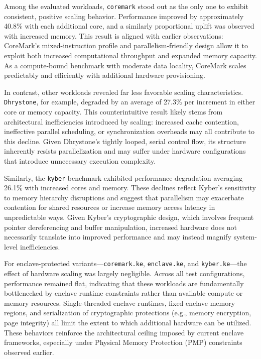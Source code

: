 Among the evaluated workloads, \texttt{coremark} stood out as the only one to exhibit consistent, positive scaling behavior. Performance improved by approximately 40.8\% with each additional core, and a similarly proportional uplift was observed with increased memory. This result is aligned with earlier observations: CoreMark’s mixed-instruction profile and parallelism-friendly design allow it to exploit both increased computational throughput and expanded memory capacity. As a compute-bound benchmark with moderate data locality, CoreMark scales predictably and efficiently with additional hardware provisioning.

In contrast, other workloads revealed far less favorable scaling characteristics. \texttt{Dhrystone}, for example, degraded by an average of 27.3\% per increment in either core or memory capacity. This counterintuitive result likely stems from architectural inefficiencies introduced by scaling: increased cache contention, ineffective parallel scheduling, or synchronization overheads may all contribute to this decline. Given Dhrystone’s tightly looped, serial control flow, its structure inherently resists parallelization and may suffer under hardware configurations that introduce unnecessary execution complexity.

Similarly, the \texttt{kyber} benchmark exhibited performance degradation averaging 26.1\% with increased cores and memory. These declines reflect Kyber’s sensitivity to memory hierarchy disruptions and suggest that parallelism may exacerbate contention for shared resources or increase memory access latency in unpredictable ways. Given Kyber’s cryptographic design, which involves frequent pointer dereferencing and buffer manipulation, increased hardware does not necessarily translate into improved performance and may instead magnify system-level inefficiencies.

For enclave-protected variants—\texttt{coremark.ke}, \texttt{enclave.ke}, and \texttt{kyber.ke}—the effect of hardware scaling was largely negligible. Across all test configurations, performance remained flat, indicating that these workloads are fundamentally bottlenecked by enclave runtime constraints rather than available compute or memory resources. Single-threaded enclave runtimes, fixed enclave memory regions, and serialization of cryptographic protections (e.g., memory encryption, page integrity) all limit the extent to which additional hardware can be utilized. These behaviors reinforce the architectural ceiling imposed by current enclave frameworks, especially under Physical Memory Protection (PMP) constraints observed earlier.


